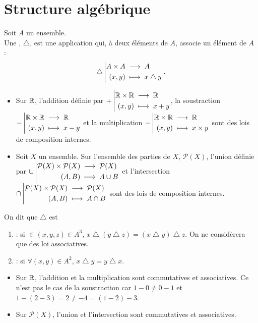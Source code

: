 \documentclass{book}
\begin{document}
\section{Structure algébrique}
\begin{Definition}
Soit $A$ un ensemble.\\
Une , $\bigtriangleup$, est une application qui, à deux éléments de $A$, associe un élément de $A$ :
$$ {\bigtriangleup}\left|\begin{aligned}{A\times A}&\;\longrightarrow\;{A}\\{(x,y)}&\;\longmapsto\;{x \bigtriangleup y}\end{aligned}\right..$$
\end{Definition}
\begin{Exemple}
\begin{itemize}
\item Sur $\mathbb{R}$, l'addition définie par ${+}\left|\begin{aligned}{\mathbb{R}\times \mathbb{R}}&\;\longrightarrow\;{\mathbb{R}}\\{(x,y)}&\;\longmapsto\;{x + y}\end{aligned}\right.$, la soustraction ${-}\left|\begin{aligned}{\mathbb{R}\times \mathbb{R}}&\;\longrightarrow\;{\mathbb{R}}\\{(x,y)}&\;\longmapsto\;{x - y}\end{aligned}\right.$ et la multiplication ${-}\left|\begin{aligned}{\mathbb{R}\times \mathbb{R}}&\;\longrightarrow\;{\mathbb{R}}\\{(x,y)}&\;\longmapsto\;{x \times y}\end{aligned}\right.$ sont des lois de composition internes.
\item Soit $X$ un ensemble. Sur l'ensemble des parties de $X$, $\mathcal{P}(X)$, l'union définie par ${\cup}\left|\begin{aligned}{\mathcal{P}(X)\times \mathcal{P}(X)}&\;\longrightarrow\;{\mathcal{P}(X)}\\{(A,B)}&\;\longmapsto\;{A \cup B}\end{aligned}\right.$ et l'intersection ${\cap}\left|\begin{aligned}{\mathcal{P}(X)\times \mathcal{P}(X)}&\;\longrightarrow\;{\mathcal{P}(X)}\\{(A,B)}&\;\longmapsto\;{A \cap B}\end{aligned}\right.$ sont des lois de composition internes.
\end{itemize}

\end{Exemple}
\begin{Definition}
On dit que $\bigtriangleup$ est
\begin{enumerate}
\item  {} : si $\in(x,y,z)\in A^3$, $x \bigtriangleup (y \bigtriangleup z) = (x \bigtriangleup y) \bigtriangleup z$.
  On ne considèrera que des loi associatives.
\item
  : si $\forall(x,y)\in A^2$, $x \bigtriangleup y = y \bigtriangleup x$.
 \end{enumerate}
\end{Definition} 
 \begin{Exemple}
\begin{itemize}
\item Sur $\mathbb{R}$, l'addition et la multiplication sont commutatives et associatives. Ce n'est pas le cas de la soustraction car $1-0\neq 0-1$ et $1-(2-3)=2\neq -4= (1-2)-3.$
\item Sur  $\mathcal{P}(X)$, l'union et l'intersection sont commutatives et associatives.
\end{itemize}
\end{Exemple}
\end{document}
